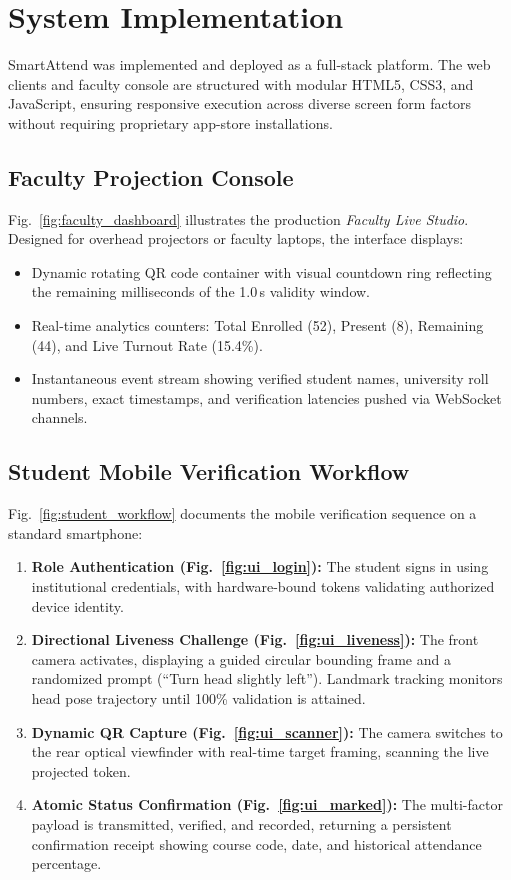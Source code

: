 \documentclass[conference]{IEEEtran}
\begin{document}
\section{System Implementation}
SmartAttend was implemented and deployed as a full-stack platform. The web clients and faculty console are structured with modular HTML5, CSS3, and JavaScript, ensuring responsive execution across diverse screen form factors without requiring proprietary app-store installations.

\subsection{Faculty Projection Console}
Fig.~\ref{fig:faculty_dashboard} illustrates the production \textit{Faculty Live Studio}. Designed for overhead projectors or faculty laptops, the interface displays:
\begin{itemize}
    \item Dynamic rotating QR code container with visual countdown ring reflecting the remaining milliseconds of the 1.0\,s validity window.
    \item Real-time analytics counters: Total Enrolled (52), Present (8), Remaining (44), and Live Turnout Rate (15.4\%).
    \item Instantaneous event stream showing verified student names, university roll numbers, exact timestamps, and verification latencies pushed via WebSocket channels.
\end{itemize}

\subsection{Student Mobile Verification Workflow}
Fig.~\ref{fig:student_workflow} documents the mobile verification sequence on a standard smartphone:
\begin{enumerate}
    \item \textbf{Role Authentication (Fig.~\ref{fig:ui_login}):} The student signs in using institutional credentials, with hardware-bound tokens validating authorized device identity.
    \item \textbf{Directional Liveness Challenge (Fig.~\ref{fig:ui_liveness}):} The front camera activates, displaying a guided circular bounding frame and a randomized prompt (``Turn head slightly left''). Landmark tracking monitors head pose trajectory until 100\% validation is attained.
    \item \textbf{Dynamic QR Capture (Fig.~\ref{fig:ui_scanner}):} The camera switches to the rear optical viewfinder with real-time target framing, scanning the live projected token.
    \item \textbf{Atomic Status Confirmation (Fig.~\ref{fig:ui_marked}):} The multi-factor payload is transmitted, verified, and recorded, returning a persistent confirmation receipt showing course code, date, and historical attendance percentage.
\end{enumerate}
\end{document}
